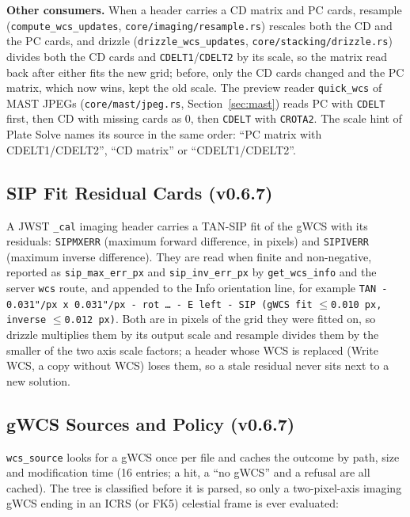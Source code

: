 \documentclass[11pt,a4paper]{article}
\newcommand{\code}[1]{\texttt{\small #1}}
\begin{document}
    \textbf{Other consumers.} When a header carries a CD matrix and PC cards, resample (\code{compute\_wcs\allowbreak\_updates}, \code{core/\allowbreak imaging/\allowbreak resample.rs}) rescales both the CD and the PC cards, and drizzle (\code{drizzle\_wcs\allowbreak\_updates}, \code{core/\allowbreak stacking/\allowbreak drizzle.rs}) divides both the CD cards and \code{CDELT1}/\code{CDELT2} by its scale, so the matrix read back after either fits the new grid; before, only the CD cards changed and the PC matrix, which now wins, kept the old scale. The preview reader \code{quick\_wcs} of MAST JPEGs (\code{core/\allowbreak mast/\allowbreak jpeg.rs}, Section~\ref{sec:mast}) reads PC with \code{CDELT} first, then CD with missing cards as 0, then \code{CDELT} with \code{CROTA2}. The scale hint of Plate Solve names its source in the same order: ``PC matrix with CDELT1/CDELT2'', ``CD matrix'' or ``CDELT1/CDELT2''.

    \subsection{SIP Fit Residual Cards (v0.6.7)}

    A JWST \code{\_cal} imaging header carries a TAN-SIP fit of the gWCS with its residuals: \code{SIPMXERR} (maximum forward difference, in pixels) and \code{SIPIVERR} (maximum inverse difference). They are read when finite and non-negative, reported as \code{sip\_max\_err\_px} and \code{sip\_inv\_err\_px} by \code{get\_wcs\_info} and the server \code{wcs} route, and appended to the Info orientation line, for example \code{TAN - 0.031"/px x 0.031"/px - rot \ldots{} - E left - SIP (gWCS fit} $\le$\code{0.010 px, inverse} $\le$\code{0.012 px)}. Both are in pixels of the grid they were fitted on, so drizzle multiplies them by its output scale and resample divides them by the smaller of the two axis scale factors; a header whose WCS is replaced (Write WCS, a copy without WCS) loses them, so a stale residual never sits next to a new solution.

    \subsection{gWCS Sources and Policy (v0.6.7)}

    \code{wcs\_source} looks for a gWCS once per file and caches the outcome by path, size and modification time (16 entries; a hit, a ``no gWCS'' and a refusal are all cached). The tree is classified before it is parsed, so only a two-pixel-axis imaging gWCS ending in an ICRS (or FK5) celestial frame is ever evaluated:
\end{document}
